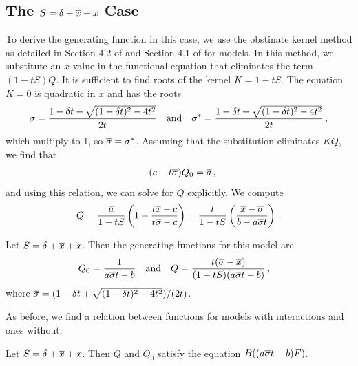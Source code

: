 \subsection{The \texorpdfstring{$S = \delta + \overline{x} + x$}{} Case}
To derive the generating function in this case, we use the obstinate kernel method as detailed in Section 4.2 of \cite[p.~12]{tabbara2014exact} and Section 4.1 of \cite[p.~13]{wong2014confining} for \twoD models. In this method, we substitute an $x$ value in the functional equation that eliminates the term $(1-tS)Q$. It is sufficient to find roots of the kernel $K = 1-tS$. The equation $K = 0$ is quadratic in $x$ and has the roots
\begin{align}
	\sigma = \frac{1-\delta t - \sqrt{(1-\delta t)^2-4t^2}}{2t} \quad\text{and}\quad \sigma^\ast = \frac{1-\delta t + \sqrt{(1-\delta t)^2-4t^2}}{2t}\,,
\end{align}
which multiply to 1, so $\overline{\sigma} = \sigma^\ast$. Assuming that the substitution eliminates $K Q$, we find that
\begin{align}
	- (c - t\overline{\sigma})Q_0 = \overline{a}\,,
\end{align}
and using this relation, we can solve for $Q$ explicitly. We compute
\begin{align}
	Q = \frac{\overline{a}}{1-t S}\left(1 - \frac{t\overline{x} -c}{t\overline{\sigma}-c}\right) = \frac{t}{1-t S}\left(\frac{\overline{x} -\overline{\sigma}}{b-a\overline{\sigma} t}\right)\,.
\end{align}
\begin{prop}\label{prop:1DBFQ}
 Let $S = \delta + \overline{x} + x$. Then the generating functions for this model are
\begin{align}
	Q_0 = \frac{1}{a\overline{\sigma} t-b}\quad \text{and}\quad Q &= \frac{t(\overline{\sigma} -\overline{x})}{(1-t S)(a\overline{\sigma} t - b)}\,,
\end{align}
where $\overline{\sigma} = (1-\delta t + \sqrt{(1-\delta t)^2-4t^2})/(2t)$.
\end{prop}
As before, we find a relation between functions for models with interactions and ones without.
\begin{prop} Let $S = \delta + \overline{x} + x$. Then $Q$ and $Q_0$ satisfy the equation $B((a \overline{\sigma} t - b)F)$.
\end{prop}

